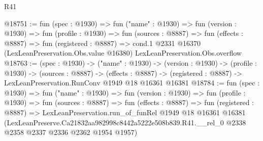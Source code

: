 \begin{lexlean}{R41}
\begin{coremodule}
@18751 := fun (spec : @1930) =>
  fun ("name" : @1930) =>
  fun (version : @1930) =>
  fun (profile : @1930) =>
  fun (sources : @8887) =>
  fun (effects : @8887) =>
  fun (registered : @8887) =>
  cond.{1} @2331 @16370 (LexLeanPreservation.Obs.value @16380) LexLeanPreservation.Obs.overflow
@18763 := (spec : @1930) ->
  ("name" : @1930) ->
  (version : @1930) ->
  (profile : @1930) ->
  (sources : @8887) ->
  (effects : @8887) -> (registered : @8887) -> LexLeanPreservation.RunConv @1949 @18 @16361 @16381
@18784 := fun (spec : @1930) =>
  fun ("name" : @1930) =>
  fun (version : @1930) =>
  fun (profile : @1930) =>
  fun (sources : @8887) =>
  fun (effects : @8887) =>
  fun (registered : @8887) =>
  LexLeanPreservation.run_of_funRel
    @1949
    @18
    @16361
    @16381
    (LexLeanPreserve.Ca21832aa982998c8442a5222e508b839.R41.__rel_0
      @2338
      @2358
      @2337
      @2336
      @2362
      @1954
      @1957)
\end{coremodule}
\end{lexlean}
